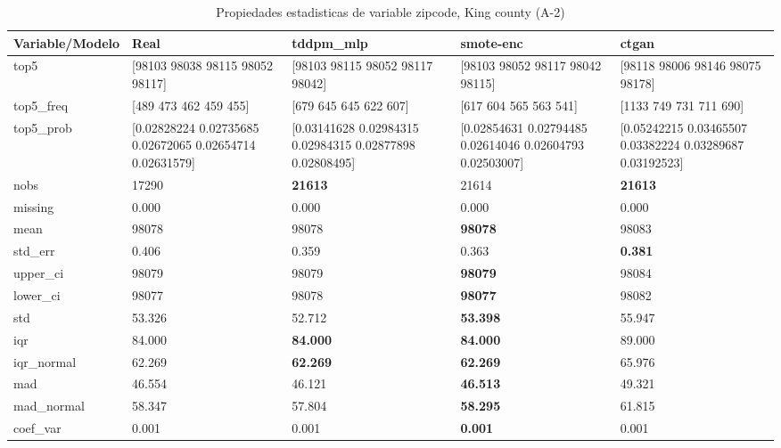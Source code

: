 \begin{table}[H]
\centering
\fontsize{8}{14}\selectfont
\caption{Propiedades  estadisticas de variable zipcode, King county (A-2)}
\label{table-stats-king county-a-2-zipcode}
\begin{tabular}{|l|m{10em}|m{10em}|m{10em}|m{10em}|}
\hline
 \rowcolor[gray]{0.8}
Variable/Modelo & Real & tddpm\_mlp & smote-enc & ctgan \\
\hline top5 & [98103 98038 98115 98052 98117] & [98103 98115 98052 98117 98042] & [98103 98052 98117 98042 98115] & [98118 98006 98146 98075 98178] \\
\hline top5\_freq & [489 473 462 459 455] & [679 645 645 622 607] & [617 604 565 563 541] & [1133  749  731  711  690] \\
\hline top5\_prob & [0.02828224 0.02735685 0.02672065 0.02654714 0.02631579] & [0.03141628 0.02984315 0.02984315 0.02877898 0.02808495] & [0.02854631 0.02794485 0.02614046 0.02604793 0.02503007] & [0.05242215 0.03465507 0.03382224 0.03289687 0.03192523] \\
\hline nobs & 17290 & \bfseries 21613 & \cellcolor[rgb]{0.9, 0.54, 0.52} 21614 & \bfseries 21613 \\
\hline missing & 0.000 & 0.000 & 0.000 & 0.000 \\
\hline mean & 98078 & 98078 & \bfseries 98078 & \cellcolor[rgb]{0.9, 0.54, 0.52} 98083 \\
\hline std\_err & 0.406 & \cellcolor[rgb]{0.9, 0.54, 0.52} 0.359 & 0.363 & \bfseries 0.381 \\
\hline upper\_ci & 98079 & 98079 & \bfseries 98079 & \cellcolor[rgb]{0.9, 0.54, 0.52} 98084 \\
\hline lower\_ci & 98077 & 98078 & \bfseries 98077 & \cellcolor[rgb]{0.9, 0.54, 0.52} 98082 \\
\hline std & 53.326 & 52.712 & \bfseries 53.398 & \cellcolor[rgb]{0.9, 0.54, 0.52} 55.947 \\
\hline iqr & 84.000 & \bfseries 84.000 & \bfseries 84.000 & \cellcolor[rgb]{0.9, 0.54, 0.52} 89.000 \\
\hline iqr\_normal & 62.269 & \bfseries 62.269 & \bfseries 62.269 & \cellcolor[rgb]{0.9, 0.54, 0.52} 65.976 \\
\hline mad & 46.554 & 46.121 & \bfseries 46.513 & \cellcolor[rgb]{0.9, 0.54, 0.52} 49.321 \\
\hline mad\_normal & 58.347 & 57.804 & \bfseries 58.295 & \cellcolor[rgb]{0.9, 0.54, 0.52} 61.815 \\
\hline coef\_var & 0.001 & 0.001 & \bfseries 0.001 & \cellcolor[rgb]{0.9, 0.54, 0.52} 0.001 \\

\end{tabular}
\end{table}

